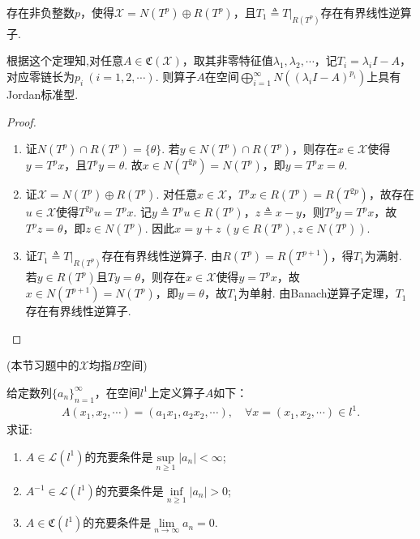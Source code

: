 \documentclass[../../main.tex]{subfiles}%
\begin{document}
\begin{theorem}
存在非负整数$p$，使得$\mathscr{X}=N(T^p)\oplus R(T^p)$，且$T_1\triangleq T|_{R(T^p)}$存在有界线性逆算子.
\end{theorem}
\begin{remark}
根据这个定理知,对任意$A\in\mathfrak{C}(\mathscr{X})$，取其非零特征值$\lambda_1,\lambda_2,\cdots$，记$T_i=\lambda_i I-A$，对应零链长为$p_i\ (i=1,2,\cdots)$.
则算子$A$在空间$\bigoplus\limits_{i=1}^\infty N((\lambda_i I-A)^{p_i})$上具有Jordan标准型.
\end{remark}
\begin{proof}
\begin{enumerate}[(1)]
\item 证$N(T^p)\cap R(T^p)=\{\theta\}$.
若$y\in N(T^p)\cap R(T^p)$，则存在$x\in\mathscr{X}$使得$y=T^p x$，且$T^p y=\theta$.
故$x\in N(T^{2p})=N(T^p)$，即$y=T^p x=\theta$.

\item 证$\mathscr{X}=N(T^p)\oplus R(T^p)$.
对任意$x\in\mathscr{X}$，$T^p x\in R(T^p)=R(T^{2p})$，故存在$u\in\mathscr{X}$使得$T^{2p}u=T^p x$.
记$y\triangleq T^p u\in R(T^p)$，$z\triangleq x-y$，则$T^p y=T^p x$，故$T^p z=\theta$，即$z\in N(T^p)$.
因此$x=y+z\ (y\in R(T^p),z\in N(T^p))$.

\item 证$T_1\triangleq T|_{R(T^p)}$存在有界线性逆算子.
由$R(T^p)=R(T^{p+1})$，得$T_1$为满射.
若$y\in R(T^p)$且$Ty=\theta$，则存在$x\in\mathscr{X}$使得$y=T^p x$，故$x\in N(T^{p+1})=N(T^p)$，即$y=\theta$，故$T_1$为单射.
由Banach逆算子定理，$T_1$存在有界线性逆算子.
\end{enumerate}
\end{proof}



(本节习题中的$\mathscr{X}$均指$B$空间)
\begin{example}
给定数列$\{a_n\}_{n=1}^{\infty}$，在空间$l^1$上定义算子$A$如下：
\begin{align*}
A(x_1,x_2,\cdots)=(a_1 x_1,a_2 x_2,\cdots),\quad \forall x=(x_1,x_2,\cdots)\in l^1.
\end{align*}
求证:
\begin{enumerate}[(1)]
\item $A\in \mathscr{L}(l^1)$的充要条件是$\sup\limits_{n\geqslant 1}|a_n|<\infty$;
\item $A^{-1}\in \mathscr{L}(l^1)$的充要条件是$\inf\limits_{n\geqslant 1}|a_n|>0$;
\item $A\in \mathfrak{C}(l^1)$的充要条件是$\lim\limits_{n\to\infty} a_n=0$.
\end{enumerate}
\end{example}
\end{document}
